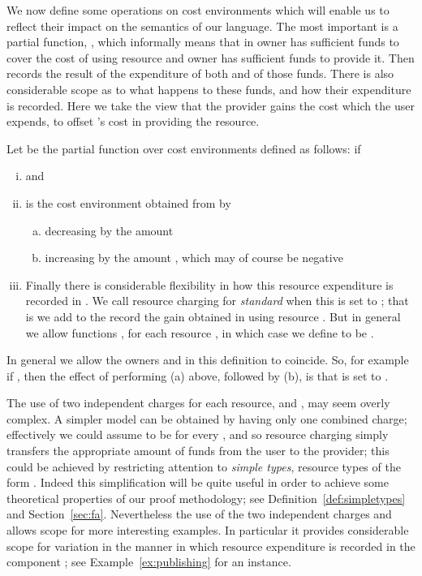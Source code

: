 \documentclass{LMCS}
\newcommand{\EndDefBox}{\null\hfill}
\newcommand{\boxHere}{\global\let\EndProof\empty\EndDefBox}
\begin{document}
We now define some operations on cost environments which will enable
us to reflect their impact on the semantics of our language. The most
important is a partial function, , which informally means that in  owner  has
sufficient funds to cover the cost of using resource  and owner
 has sufficient funds to provide it.  Then  records
the result of the expenditure of both  and  of
those funds. There is also considerable scope as to what happens to
these funds, and how their expenditure is recorded.  Here we take the
view that the provider  gains the cost which the user
expends, to offset  's cost in providing the resource.
\begin{defi}\label{def:rescharging}
  Let  be the partial function 
over cost environments defined as follows:
 if
\begin{enumerate}[(i)]



\item  and 


\item   is the cost environment obtained from  by 
  \begin{enumerate}[(a)]
  \item decreasing  by the amount  

  \item increasing   by the 
amount , which may of course be negative


  \end{enumerate}

\item 
  Finally there is considerable flexibility in how this resource
  expenditure is recorded in .  We call resource 
  charging  for   \emph{standard} when this is set to ; that is we add to the record the gain
  obtained in using resource .  But in general we allow functions
  , for each resource , in which case we define
   to be . \boxHere
\end{enumerate}
\end{defi}
\noindent
In general we allow the owners  and  in this definition
to coincide. So, for example if 
, then the effect of performing (a) above, 
followed by (b), is that 
 is set to  .
 
The use of two independent charges for each resource,  and
, may seem overly complex. A simpler model can be obtained by
having only one combined charge; effectively we could assume
 to be  for every , and so resource charging simply
transfers the appropriate amount of funds from the user to the
provider; this could be achieved by restricting attention to
\emph{simple types}, resource types  of the form .
Indeed this simplification will be quite useful in order to achieve
some theoretical  properties of our proof methodology; see 
Definition~\ref{def:simpletypes} and Section~\ref{sec:fa}.
Nevertheless 
the use of the two independent charges  and  allows scope for more
interesting examples. In particular it provides considerable scope for variation 
in the manner in which resource expenditure is recorded in the component ;
see Example~\ref{ex:publishing} for an instance.
\end{document}
